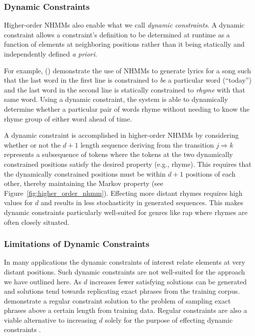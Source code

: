 \documentclass[phd,electronic,oneside,twosidetoc,letterpaper,chaptercenter,parttop,lol,lof,lot]{byumsphd}
\begin{document}
\subsubsection{Dynamic Constraints}

Higher-order NHMMs also enable what we call \textit{dynamic constraints}. A dynamic constraint allows a constraint's definition to be determined at runtime as a function of elements at neighboring positions rather than it being statically and independently defined \textit{a priori}.

For example, \citeauthor{barbieri2012markov} (\citeyear{barbieri2012markov}) demonstrate the use of NHMMs to generate lyrics for a song such that the last word in the first line is constrained to \textit{be} a particular word (``today'') and the last word in the second line is statically constrained to \textit{rhyme} with that same word. Using a dynamic constraint, the system is able to dynamically determine whether a particular pair of words rhyme without needing to know the rhyme group of either word ahead of time.

A dynamic constraint is accomplished in higher-order NHMMs by considering whether or not the $d + 1$ length sequence deriving from the transition $j \Rightarrow k$ represents a subsequence of tokens where the tokens at the two dynamically constrained positions satisfy the desired property (e.g., rhyme). This requires that the dynamically constrained positions must be within $d+1$ positions of each other, thereby maintaining the Markov property (see Figure~\ref{fig:higher_order_nhmm}). Effecting more distant rhymes requires high values for $d$ and results in less stochasticity in generated sequences. This makes dynamic constraints particularly well-suited for genres like rap where rhymes are often closely situated.

\subsubsection{Limitations of Dynamic Constraints}

In many applications the dynamic constraints of interest relate elements at very distant positions. Such dynamic constraints are not well-suited for the approach we have outlined here. As $d$ increases fewer satisfying solutions can be generated and solutions tend towards replicating exact phrases from the training corpus. \cite{papadopoulos2014avoiding} demonstrate a regular constraint solution to the problem of sampling exact phrases above a certain length from training data. Regular constraints are also a viable alternative to increasing $d$ solely for the purpose of effecting dynamic constraints \cite{bodily2018relational}.
\end{document}

